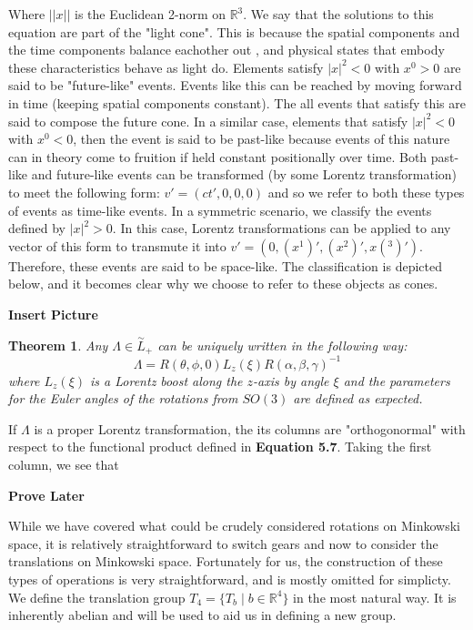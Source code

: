 \documentclass[10pt]{ucthesis}
\newcommand{\R}{\mathbb{R}}
\newtheorem{theorem}[definition]{Theorem}
\begin{document}
Where $||x||$ is the Euclidean 2-norm on $\R^3$. We say that the solutions to this equation are part of the "light cone". This is because the spatial components and the time components balance eachother out , and physical states that embody these characteristics behave as light do. Elements satisfy $|x|^2 < 0$ with $x^0>0$ are said to be "future-like" events. Events like this can be reached by moving forward in time (keeping spatial components constant). The all events that satisfy this are said to compose the future cone. In a similar case, elements that satisfy $|x|^2 < 0$ with $x^0<0$, then the event is said to be past-like because events of this nature can in theory come to fruition if held constant positionally over time. Both past-like and future-like events can be transformed (by some Lorentz transformation) to meet the following form: $v' = (ct',0,0,0)$ and so we refer to both these types of events as time-like events. In a symmetric scenario, we classify the events defined by $|x|^2 >0$. In this case, Lorentz transformations can be applied to any vector of this form to transmute it into $v' = (0,(x^1)',(x^2)',x(^3)')$. Therefore, these events are said to be space-like. The classification is depicted below, and it becomes clear why we choose to refer to these objects as cones.

\textbf{Insert Picture}

\begin{theorem}
	Any $\Lambda \in \overset{\sim}{L}_+$ can be uniquely written in the following way:
$$\Lambda = R(\theta,\phi,0)L_z(\xi)R(\alpha,\beta,\gamma)^{-1}$$
where $L_z(\xi)$ is a Lorentz boost along the $z$-axis by angle $\xi$ and the parameters for the Euler angles of the rotations from $SO(3)$ are defined as expected.
\end{theorem}

If $\Lambda$ is a proper Lorentz transformation, the its columns are "orthogonormal" with respect to the functional product defined in \textbf{Equation 5.7}. Taking the first column, we see that 

\textbf{Prove Later}

While we have covered what could be crudely considered rotations on Minkowski space, it is relatively straightforward to switch gears and now to consider the translations on Minkowski space. Fortunately for us, the construction of these types of operations is very straightforward, and is mostly omitted for simplicty. We define the translation group $T_4 = \{T_b \mid b\in\R^4\}$ in the most natural way. It is inherently abelian and will be used to aid us in defining a new group.
\end{document}
